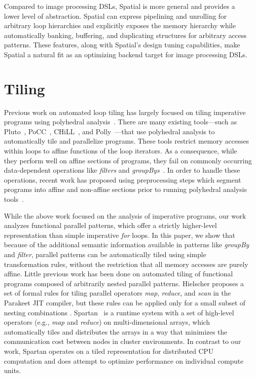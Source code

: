 Compared to image processing DSLs, Spatial is more general and provides a
lower level of abstraction. Spatial can express pipelining and unrolling for arbitrary loop hierarchies and explicitly exposes the memory hierarchy while automatically banking, buffering, and duplicating structures for arbitrary
access patterns. These features, along with Spatial's design tuning
capabilities, make Spatial a natural fit as an optimizing backend target for image processing DSLs.

\section{Tiling}
Previous work on automated loop tiling has largely focused on tiling imperative programs
using polyhedral analysis~\cite{bondhugula08,pouchet10phd}.
There are many existing tools---such as Pluto~\cite{pluto08pldi},
PoCC~\cite{pouchet11popl}, CHiLL~\cite{chen2008chill},
and Polly~\cite{grosser2012polly}---that use polyhedral analysis
to automatically tile and parallelize programs.  These tools restrict memory
accesses within loops to affine functions of the loop iterators.
As a consequence, while they perform well on affine sections of programs,
they fail on commonly occurring data-dependent operations
like \emph{filters} and \emph{groupBys}~\cite{benabderrahmane10cc}. In order to handle these operations,
recent work has proposed using preprocessing steps which segment programs into affine
and non-affine sections prior to running polyhedral analysis tools~\cite{venkat}.

While the above work focused on the analysis of imperative programs, our work
analyzes functional parallel patterns, which offer a strictly higher-level representation
than simple imperative \emph{for} loops.
In this paper, we show that because of the additional semantic information
available in patterns like \emph{groupBy} and \emph{filter},
parallel patterns can be automatically tiled using
simple transformation rules, without the restriction that all memory accesses
are purely affine.
Little previous work has been done on automated tiling of functional
programs composed of arbitrarily nested parallel patterns.
Hielscher proposes a set of formal rules for tiling parallel operators \emph{map}, \emph{reduce}, and \emph{scan}
in the Parakeet JIT compiler, but these rules can be applied only for a small subset of nesting combinations \cite{parakeet}.
Spartan~\cite{spartan} is a runtime system with a set of high-level operators
(e.g., \emph{map} and \emph{reduce}) on multi-dimensional arrays, which
automatically tiles and distributes the arrays in a way that minimizes the
communication cost between nodes in cluster environments. In contrast to
our work, Spartan
operates on a tiled representation for distributed CPU computation and does attempt to optimize
performance on individual compute units.

